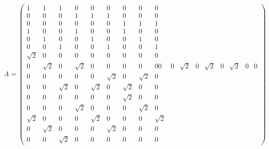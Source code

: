 \begin{equation}
	A=
	\begin{pmatrix}
    1 & 1 & 1 & 0 & 0 & 0 & 0 & 0 & 0 \\
    0 & 0 & 0 & 1 & 1 & 1 & 0 & 0 & 0 \\
    0 & 0 & 0 & 0 & 0 & 0 & 1 & 1 & 1 \\
    1 & 0 & 0 & 1 & 0 & 0 & 1 & 0 & 0 \\
    0 & 1 & 0 & 0 & 1 & 0 & 0 & 1 & 0 \\
    0 & 0 & 1 & 0 & 0 & 1 & 0 & 0 & 1 \\
    \sqrt{2} & 0 & 0 & 0 & 0 & 0 & 0 & 0 & 0 \\
    0 & \sqrt{2} & 0 & \sqrt{2} & 0 & 0 & 0 & 0 & 0
    0 & 0 & \sqrt{2} & 0 & \sqrt{2} & 0 & \sqrt{2} & 0 & 0 \\
    0 & 0 & 0 & 0 & 0 & \sqrt{2} & 0 & \sqrt{2} & 0 \\
    0 & 0 & \sqrt{2} & 0 & \sqrt{2} & 0 & \sqrt{2} & 0 & 0 \\
    0 & 0 & 0 & 0 & 0 & 0 & \sqrt{2} & 0 & 0 \\
    0 & 0 & 0 & \sqrt{2} & 0 & 0 & 0 & \sqrt{2} & 0 \\
    \sqrt{2} & 0 & 0 & 0 & \sqrt{2} & 0 & 0 & 0 & \sqrt{2} \\
    0 & \sqrt{2} & 0 & 0 & 0 & \sqrt{2} & 0 & 0 & 0 \\
    0 & 0 & \sqrt{2} & 0 & 0 & 0 & 0 & 0 & 0
	\end{pmatrix}
\end{equation}

